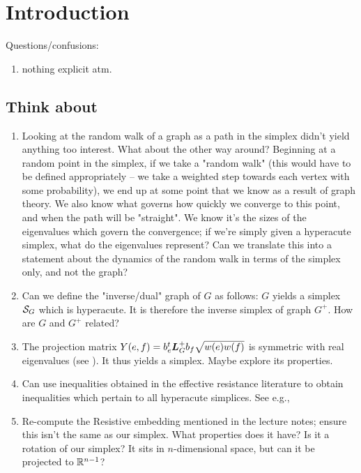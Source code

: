 \chapter{Introduction}

Questions/confusions: 
\begin{enumerate}
\item nothing explicit atm. 

\end{enumerate}



\section{Think about}
\begin{enumerate}	
	\item Looking at the random walk of a graph as a path in the simplex didn't yield anything too interest. What about the other way around? Beginning at a random point in the simplex, if we take a "random walk" (this would have to be defined appropriately -- we take a weighted step towards each vertex with some probability), we end up at some point that we know as a result of graph theory. We also know what governs how quickly we converge to this point, and when the path will be "straight". We know it's the sizes of the eigenvalues which govern the convergence; if we're simply given a hyperacute simplex, what do the eigenvalues represent? Can we translate this into a statement about the dynamics of the random walk in terms of the simplex only, and not the graph?
	\item Can we define the "inverse/dual" graph of $G$ as follows: $G$ yields a simplex $\mathcal{S}_G$ which is hyperacute. It is therefore the inverse simplex of  graph $G^+$. How are $G$ and $G^+$ related?
	\item The projection matrix $Y(e,f)=b_e^t \vb*{L}_G^+b_f\sqrt{w(e)w(f)}$ is symmetric with real eigenvalues (see \cite{vishnoi2013lx}). It thus yields a simplex. Maybe explore its properties. 
	\item Can use inequalities obtained in the effective resistance literature to obtain inequalities which pertain to all hyperacute simplices. See e.g.,\cite{alev2017graph} 
\item Re-compute the Resistive embedding mentioned in the lecture notes; ensure this isn't the same as our simplex. What properties does it have? Is it a rotation of our simplex? It sits in $n$-dimensional space, but can it be projected to $\mathbb{R}^{n-1}$? 

\end{enumerate}
